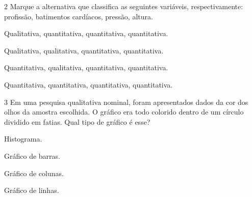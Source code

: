 



\num{2} Marque a alternativa que classifica as seguintes variáveis,
respectivamente: profissão, batimentos cardíacos, pressão, altura.

\begin{escolha}
\item Qualitativa, quantitativa, quantitativa, quantitativa.
\item Qualitativa, qualitativa, quantitativa, quantitativa.
\item Quantitativa, qualitativa, quantitativa, quantitativa.
\item Quantitativa, quantitativa, quantitativa, quantitativa.
\end{escolha}







\num{3} Em uma pesquisa qualitativa nominal, foram apresentados dados da cor
dos olhos da amostra escolhida. O gráfico era todo colorido dentro de um
círculo dividido em fatias. Qual tipo de gráfico é esse?

\begin{escolha}
\item
  Histograma.
\item
  Gráfico de barras.
\item
  Gráfico de colunas.
\item
  Gráfico de linhas.
\end{escolha}

